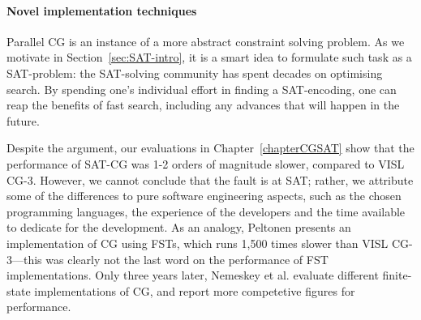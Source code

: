 











\paragraph{Novel implementation techniques} 
Parallel CG is an instance of a more abstract constraint solving problem.
As we motivate in Section~\ref{sec:SAT-intro}, it is a smart idea to formulate such task as a SAT-problem: the SAT-solving community has spent decades on optimising search. By spending one's individual effort in finding a SAT-encoding, one can reap the benefits of
fast search, including any advances that will happen in the future.

Despite the argument, our evaluations in Chapter~\ref{chapterCGSAT} show that the performance of SAT-CG was 1-2 orders of magnitude slower, compared to VISL CG-3. 
However, we cannot conclude that the fault is at SAT; rather, we attribute some of the differences to pure software engineering aspects, such as the chosen programming languages, the experience of the developers and the time available to dedicate for the development.
As an analogy, Peltonen \cite{peltonen2011} presents an implementation of CG using FSTs, which runs 1,500 times slower than VISL CG-3---this was clearly not the last word on the performance of FST implementations. Only three years later, Nemeskey et al. \cite{nemeskey14} evaluate different finite-state implementations of CG, and report more competetive figures for performance.

